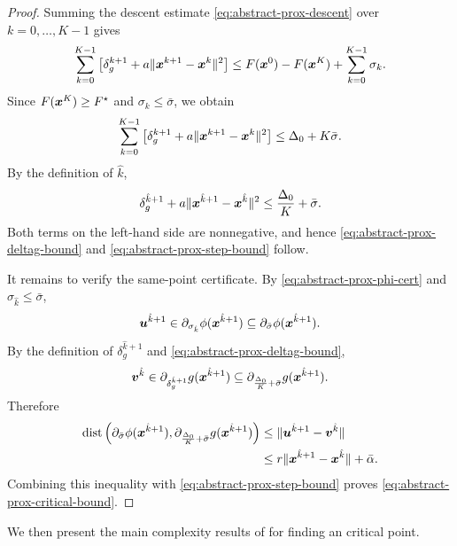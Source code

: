 \documentclass[english]{article}
\begin{document}
\begin{proof}
Summing the descent estimate \eqref{eq:abstract-prox-descent} over
$k=0,\ldots,K-1$ gives
\[
    \sum_{k=0}^{K-1}
    \left[
        \delta_g^{k+1}
        +
        a\|\bm{x}^{k+1}-\bm{x}^k\|^2
    \right]
    \le
    F(\bm{x}^0)-F(\bm{x}^K)+\sum_{k=0}^{K-1}\sigma_k .
\]
Since $F(\bm{x}^K)\ge F^\star$ and $\sigma_k\le\bar\sigma$, we obtain
\begin{equation}
    \sum_{k=0}^{K-1}
    \left[
        \delta_g^{k+1}
        +
        a\|\bm{x}^{k+1}-\bm{x}^k\|^2
    \right]
    \le
    \Delta_0+K\bar\sigma .
    \label{eq:abstract-prox-telescope}
\end{equation}
By the definition of $\hat k$,
\[
    \delta_g^{\hat k+1}
    +
    a\|\bm{x}^{\hat k+1}-\bm{x}^{\hat k}\|^2
    \le
    \frac{\Delta_0}{K}+\bar\sigma .
\]
Both terms on the left-hand side are nonnegative, and hence
\eqref{eq:abstract-prox-deltag-bound} and
\eqref{eq:abstract-prox-step-bound} follow.

It remains to verify the same-point certificate. By
\eqref{eq:abstract-prox-phi-cert} and $\sigma_{\hat k}\le\bar\sigma$,
\[
    \bm{u}^{\hat k+1}
    \in
    \partial_{\sigma_{\hat k}}\phi(\bm{x}^{\hat k+1})
    \subseteq
    \partial_{\bar\sigma}\phi(\bm{x}^{\hat k+1}).
\]
By the definition of $\delta_g^{\hat k+1}$ and
\eqref{eq:abstract-prox-deltag-bound},
\[
    \bm{v}^{\hat k}
    \in
    \partial_{\delta_g^{\hat k+1}}g(\bm{x}^{\hat k+1})
    \subseteq
    \partial_{\frac{\Delta_0}{K}+\bar\sigma}g(\bm{x}^{\hat k+1}).
\]
Therefore
\[
\begin{aligned}
    \operatorname{dist}
    \left(
        \partial_{\bar\sigma}\phi(\bm{x}^{\hat k+1}),
        \partial_{\frac{\Delta_0}{K}+\bar\sigma}g(\bm{x}^{\hat k+1})
    \right)
    &\le
    \|\bm{u}^{\hat k+1}-\bm{v}^{\hat k}\|
    \\
    &\le
    r\|\bm{x}^{\hat k+1}-\bm{x}^{\hat k}\|+\bar\alpha .
\end{aligned}
\]
Combining this inequality with \eqref{eq:abstract-prox-step-bound}
proves \eqref{eq:abstract-prox-critical-bound}.
\end{proof}
We then present the main complexity results of  for finding an critical point.
\end{document}
